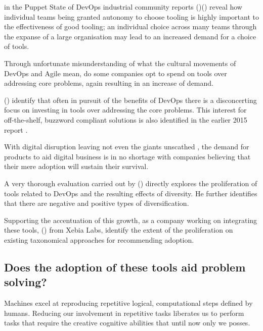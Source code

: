 \citeauthor{sodrPuppet2017} in the Puppet State of DevOps industrial community reports ()() reveal how individual teams being granted autonomy to choose tooling is highly important to the effectiveness of good tooling; an individual choice across many teams through the expanse of a large organisation may lead to an increased demand for a choice of tools.

Through unfortunate misunderstanding of what the cultural movements of DevOps and Agile mean, do some companies opt to spend on tools over addressing core problems, again resulting in an increase of demand.

\citeauthor{sodrAccelerate2018} () identify that often in pursuit of the benefits of DevOps there is a disconcerting focus on investing in tools over addressing the core problems. This interest for off-the-shelf, buzzword compliant solutions is also identified in the earlier 2015 report \parencite{sodrPuppet2015}.

With digital disruption leaving not even the giants unscathed \parencite{weForum2016}, the demand for products to aid digital business is in no shortage with companies believing that their mere adoption will sustain their survival.

A very thorough evaluation carried out by \citeauthor{kersten2018cambrian} () directly explores the proliferation of tools related to DevOps and the resulting effects of diversity. He further identifies that there are negative and positive types of diversification.

Supporting the accentuation of this growth, as a company working on integrating these tools, \citeauthor{xebiaLabs2019DevOpsReflections} () from Xebia Labs, identify the extent of the proliferation on existing taxonomical approaches for recommending adoption.

\subsection{Does the adoption of these tools aid problem solving?}

Machines excel at reproducing repetitive logical, computational steps defined by humans. Reducing our involvement in repetitive tasks liberates us to perform tasks that require the creative cognitive abilities that until now only we posses.  

